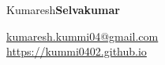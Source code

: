 \documentclass{res}
\begin{document}
	\hspace*{-0.05\textwidth}
	\begin{minipage}[t]{0.6\textwidth}
	\begin{flushleft}
	\vspace*{\fill}
	{\fontsize{30}{30}\selectfont Kumaresh\textbf{Selvakumar}}
	\end{flushleft}
	\end{minipage}
	\begin{minipage}[t]{0.44\textwidth}
	\begin{flushright}
	\href{mailto:kumaresh.kummi04@gmail.com}{kumaresh.kummi04@gmail.com} \\ \url{https://kummi0402.github.io} \\ 
	\end{flushright}
	\end{minipage}
\end{document}
